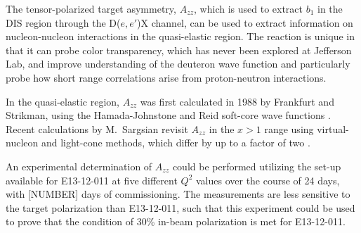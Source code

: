 

The tensor-polarized target asymmetry, $A_{zz}$, which is used to extract $b_1$ in the DIS region through the D($e,e'$)X channel, can be used to extract information on nucleon-nucleon interactions in the quasi-elastic region. The reaction is unique in that it can probe color transparency, which has never been explored at Jefferson Lab, and improve understanding of the deuteron wave function and particularly probe how short range correlations arise from proton-neutron interactions.

In the quasi-elastic region, $A_{zz}$ was first calculated in 1988 by Frankfurt and Strikman, using the Hamada-Johnstone and Reid soft-core wave functions \cite{Frankfurt:1988nt}. Recent calculations by {M.~Sargsian} revisit $A_{zz}$ in the $x>1$ range using virtual-nucleon and light-cone methods, which differ by up to a factor of two \cite{MISAK}.


An experimental determination of $A_{zz}$ could be performed utilizing the set-up available for E13-12-011 at five different $Q^2$ values over the course of 24 days, with [NUMBER] days of commissioning. The measurements are less sensitive to the target polarization than E13-12-011, such that this experiment could be used to prove that the condition of 30\% in-beam polarization is met for E13-12-011.